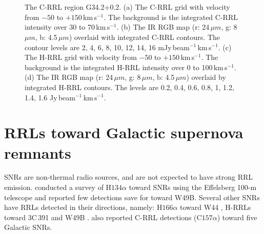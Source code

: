 \documentclass[manuscript]{aastex61}
\newcommand{\kms}{\,km\,s$^{-1}$}
\newcommand{\um}{\mu m}
\begin{document}
\begin{figure}[htbp]
\centering
{}
\\
\\ 
\caption{The C-RRL region G34.2+0.2.
          (a) The C-RRL grid with velocity from $-50$ to $+150$\kms.
	  The background is the integrated C-RRL intensity over 30 to 70\kms.
	  (b) The IR RGB map (r: 24\,$\um$, g: 8\,$\um$, b: 4.5\,$\um$) overlaid with integrated C-RRL contours.
	  The contour levels are 2, 4, 6, 8, 10, 12, 14, 16 mJy\,beam$^{-1}$\kms.
	  (c) The H-RRL grid with velocity from $-50$ to $+150$\kms.
	  The background is the integrated H-RRL intensity over 0 to 100\kms.
	  (d) The IR RGB map (r: 24\,$\um$, g: 8\,$\um$, b: 4.5\,$\um$) overlaid by integrated H-RRL contours.
	  The levels are 0.2, 0.4, 0.6, 0.8, 1, 1.2, 1.4, 1.6 Jy\,beam$^{-1}$\kms.
	  }
\label{fig_crrl-g342}
\end{figure}

\section{RRLs toward Galactic supernova remnants} \label{sec_snr}

SNRs are non-thermal radio sources, and are not expected to have strong RRL emission.
\citet{Downes1974} conducted a survey of H$134\alpha$ toward SNRs using the Effelsberg 100-m telescope and reported few detections save for toward W49B.
Several other SNRs have RRLs detected in their directions, namely: H$166\alpha$ toward W44 \citep{Bignell1973}, H-RRLs toward 3C\,391 and W49B \citep{Cesarsky1973a,Pankonin1975}.
\citet{Cesarsky1976} also reported C-RRL detections (C$157\alpha$) toward five Galactic SNRs.
\end{document}
